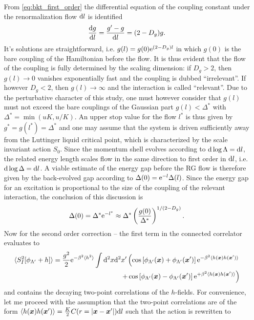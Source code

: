From \cref{eq:bkt_first_order} the differential equation of the coupling constant under the renormalization flow $\mathrm d l$ is identified
\begin{align}
    \frac{\mathrm d g}{\mathrm d l} = \frac{g'-g}{\mathrm d l} = (2-D_g)g.
\end{align}
It's solutions are straightforward, i.e. $g(l) = g(0)\mathrm e^{(2-D_g)l}$ in which $g(0)$ is the bare coupling of the Hamiltonian before the flow.
It is thus evident that the flow of the coupling is fully determined by the scaling dimension: if $D_g>2$, then $g(l)\rightarrow0$ vanishes exponentially fast and the coupling is dubbed ``irrelevant''.
If however $D_g<2$, then $g(l)\rightarrow\infty$ and the interaction is called ``relevant''.
Due to the perturbative character of this study, one must however consider that $g(l)$ must not exceed the bare couplings of the Gaussian part $g(l)<\Delta^*$ with $\Delta^*=\min(uK,u/K)$.
An upper stop value for the flow $l^*$ is thus given by $g^*=g(l^*)=\Delta^*$ and one may assume that the system is driven sufficiently away from the Luttinger liquid critical point, which is characterized by the scale invariant action $S_0$.
Since the momentum shell evolves according to $\mathrm d\log\Lambda=\mathrm d l$, the related energy length scales flow in the same direction to first order in $\mathrm d l$, i.e. $\mathrm d\log\Delta = \mathrm d l$.
A viable estimate of the energy gap before the RG flow is therefore given by the back-evolved gap according to $\Delta(0)=\mathrm e^{-l}\Delta(l)$.
Since the energy gap for an excitation is proportional to the size of the coupling of the relevant interaction, the conclusion of this discussion is
\begin{align}
    \Delta(0) = \Delta^*\mathrm e^{-l^*} \approx \Delta^*\left( \frac{g(0)}{\Delta^*} \right)^{1/(2-D_g)}.
\end{align}
Now for the second order correction -- the first term in the connected correlator evaluates to
\begin{align}
    \braket{S^2_I[\phi_{\Lambda'}+h]}=\frac{g^2}2\mathrm e^{-\beta^2\braket{h^2}}\int\mathrm d^2x\mathrm d^2x'
    \left(
        \cos\left[ \phi_{\Lambda'}({\bm x})+\phi_{\Lambda'}({\bm x'}) \right]\mathrm e^{-\beta^2\braket{h({\bm x})h({\bm x'})}}
        \right.\\
        \left.+
        \cos\left[ \phi_{\Lambda'}({\bm x})-\phi_{\Lambda'}({\bm x'}) \right]\mathrm e^{+\beta^2\braket{h({\bm x})h({\bm x'})}}
    \right)
    \label{eq:second_order_rg_term1}
\end{align}
and contains the decaying two-point correlations of the $h$-fields.
For convenience, let me proceed with the assumption that the two-point correlations are of the form $\braket{h({\bm x})h({\bm x'})} = \frac K2 C(r=|{\bm x}-{\bm x'}|)\mathrm d l$ such that the action is rewritten to
